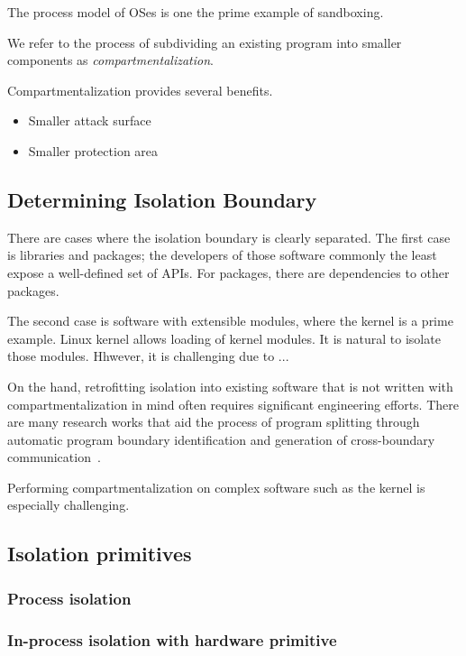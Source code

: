 \documentclass[11pt]{memoir}
\begin{document}
The process model of OSes is one the prime example of sandboxing.

We refer to the process of subdividing an existing program into smaller components as \emph{compartmentalization}.

Compartmentalization provides several benefits.
\begin{itemize}
    \item Smaller attack surface
    \item Smaller protection area
\end{itemize}


\subsection{Determining Isolation Boundary}
There are cases where the isolation boundary is clearly separated.
The first case is libraries and packages; the developers of those software commonly  the least expose a well-defined set of APIs.
For packages, there are dependencies to other packages.

The second case is software with extensible modules, where the kernel is a prime example.
Linux kernel allows loading of kernel modules. 
It is natural to isolate those modules.
Hhwever, it is challenging due to ...


On the hand, retrofitting isolation into existing software that is not written with compartmentalization in mind often requires significant engineering efforts.
There are many research works that aid the process of program splitting through automatic program boundary identification and generation of cross-boundary communication~\cite{huang2022ksplit,kilpatrick2003privman,bittauwedge,liu2017ptrsplit,gudka2015clean,lind2017glamdring,almakhdhub2020mu}.


Performing compartmentalization on complex software such as the kernel is especially challenging.



\subsection{Isolation primitives}
\subsubsection{Process isolation}

\subsubsection{In-process isolation with hardware primitive}
\end{document}
